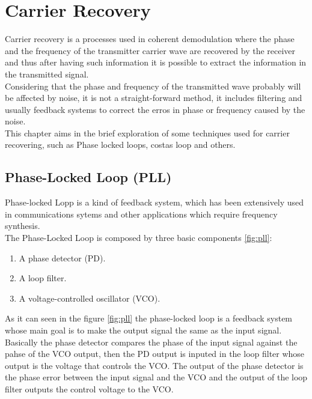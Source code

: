 \chapter{Carrier Recovery}

Carrier recovery is a processes used in coherent demodulation where the phase
and the frequency of the transmitter carrier wave are recovered by the receiver
and thus after having such information it is possible to extract the information
in the transmitted signal.\\
Considering that the phase and frequency of the transmitted wave probably will 
be affected by noise, it is not a straight-forward method, it includes filtering
and usually feedback systems to correct the erros in phase or frequency caused
by the noise.\\
This chapter aims in the brief exploration of some techniques used for carrier
recovering, such as Phase locked loops, costas loop and others.\\

\section{Phase-Locked Loop (PLL)}
\label{sec:pll}

Phase-locked Lopp is a kind of feedback system, which has been extensively used
in communications sytems and other applications which require frequency
synthesis.\\
The Phase-Locked Loop is composed by three basic components \ref{fig:pll}:

\begin{enumerate}
    \item A phase detector (PD).
    \item A loop filter.
    \item A voltage-controlled oscillator (VCO).
\end{enumerate}

As it can seen in the figure \ref{fig:pll} the phase-locked loop is a feedback
system whose main goal is to make the output signal the same as the input
signal. Basically the phase detector compares the phase of the input signal
against the pahse of the VCO output, then the PD output is inputed in the loop
filter whose output is the voltage that controls the VCO. The output of the
phase detector is the phase error between the input signal and the VCO and the
output of the loop filter outputs the control voltage to the VCO.\\

